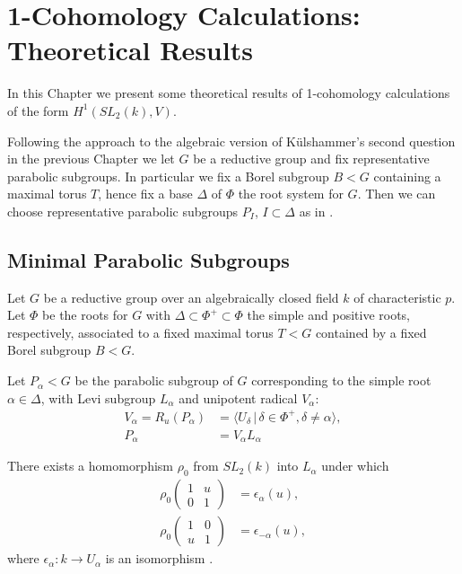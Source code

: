 
\chapter{1-Cohomology Calculations: Theoretical Results}
\label{Chapter5}

In this Chapter we present some theoretical results of 1-cohomology calculations of the form $H^1(SL_2(k), V)$. 

Following the approach to the algebraic version of K\"ulshammer's second question in the previous Chapter we let $G$ be a reductive group and fix representative parabolic subgroups. In particular we fix a Borel subgroup $B<G$ containing a maximal torus $T$, hence fix a base $\Delta$ of $\Phi$ the root system for $G$. Then we can choose representative parabolic subgroups $P_I$, $I \subset \Delta$ as in \cite[\S 30]{humphreys1975linear}.

\section{Minimal Parabolic Subgroups}

Let $G$ be a reductive group over an algebraically closed field $k$ of characteristic $p$. Let $\Phi$ be the roots for $G$ with $\Delta \subset \Phi^+ \subset \Phi$ the simple and positive roots, respectively, associated to a fixed maximal torus $T < G$ contained by a fixed Borel subgroup $B < G$.

Let $P_\alpha<G$ be the parabolic subgroup of $G$ corresponding to the simple root $\alpha\in\Delta$, with Levi subgroup $L_\alpha$ and unipotent radical $V_\alpha$:
\begin{align*}
V_\alpha=R_u(P_\alpha) &= \langle U_\delta \,|\, \delta \in \Phi^+, \delta \neq \alpha \rangle,\\
P_\alpha &= V_\alpha L_\alpha 
\end{align*}

There exists a homomorphism $\rho_0$ from $ SL_2(k)$ into $L_\alpha$ under which
\begin{align*}
\rho_0 \left(\begin{matrix} 1 &  u \\ 0 & 1 \end{matrix} \right) &= \epsilon_\alpha(u), \\
\rho_0 \left(\begin{matrix} 1 & 0 \\ u & 1 \end{matrix} \right) &= \epsilon_{-\alpha}(u),
\end{align*}
where $\epsilon_\alpha : k \rightarrow U_\alpha$ is an isomorphism \cite[Theorem 26.3(c)]{humphreys1975linear}.

